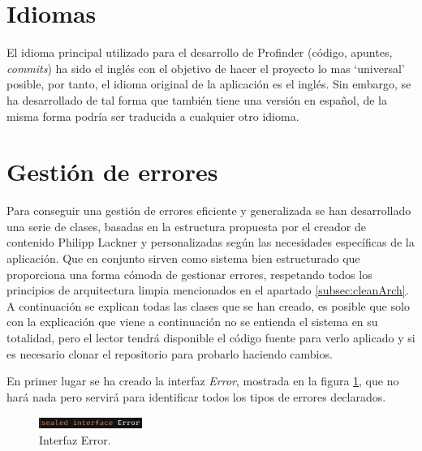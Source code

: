 \section{Idiomas}
El idioma principal utilizado para el desarrollo de Profinder (código, apuntes, \textit{commits}) ha sido el inglés con el objetivo de hacer el proyecto lo mas ‘universal’ posible, por tanto, el idioma original de la aplicación es el inglés. Sin embargo, se ha desarrollado de tal forma que también tiene una versión en español, de la misma forma podría ser traducida a cualquier otro idioma.

\section{Gestión de errores} 
Para conseguir una gestión de errores eficiente y generalizada se han desarrollado una serie de clases, basadas en la estructura propuesta por el creador de contenido Philipp Lackner\hyperlink{cap:biblio}{} y personalizadas según las necesidades específicas de la aplicación. Que en conjunto sirven como sistema bien estructurado que proporciona una forma cómoda de gestionar errores, respetando todos los principios de arquitectura limpia mencionados en el apartado \ref{subsec:cleanArch}. A continuación se explican todas las clases que se han creado, es posible que solo con la explicación que viene a continuación no se entienda el sistema en su totalidad, pero el lector tendrá disponible el código fuente para verlo aplicado y si es necesario clonar el repositorio para probarlo haciendo cambios.

En primer lugar se ha creado la interfaz \textit{Error}, mostrada en la figura \ref{fig:error_interface}, que no hará nada pero servirá para identificar todos los tipos de errores declarados.
\begin{figure}[h]
    \centering
    \includegraphics[width = 0.3\textwidth]{Imagenes/Fuentes/error_interface.png}
    \caption{Interfaz Error.}
    \label{fig:error_interface}
\end{figure}

